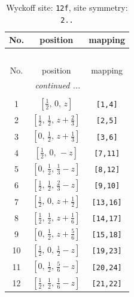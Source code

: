 \documentclass[fleqn,8pt]{jsarticle}
\begin{document}
\begin{longtable}{ccc}
\caption{Wyckoff site: {\tt 12f}, site symmetry: {\tt 2..}}
 \\
 \hline \hline
No. & position & mapping \\ \hline \endfirsthead

\multicolumn{2}{l}{\tablename\ \thetable{}} \\
 \hline \hline
No. & position & mapping \\ \hline \endhead

 \hline \hline
\multicolumn{2}{r}{\footnotesize\it continued ...} \\ \endfoot

 \hline \hline
\multicolumn{2}{r}{} \\ \endlastfoot

1 & $\left[ \frac{1}{2},\, 0,\, z \right]$ & {\tt [1,4]} \\ \hline
2 & $\left[ \frac{1}{2},\, \frac{1}{2},\, z + \frac{2}{3} \right]$ & {\tt [2,5]} \\ \hline
3 & $\left[ 0,\, \frac{1}{2},\, z + \frac{1}{3} \right]$ & {\tt [3,6]} \\ \hline
4 & $\left[ \frac{1}{2},\, 0,\, - z \right]$ & {\tt [7,11]} \\ \hline
5 & $\left[ 0,\, \frac{1}{2},\, \frac{1}{3} - z \right]$ & {\tt [8,12]} \\ \hline
6 & $\left[ \frac{1}{2},\, \frac{1}{2},\, \frac{2}{3} - z \right]$ & {\tt [9,10]} \\ \hline
7 & $\left[ \frac{1}{2},\, 0,\, z + \frac{1}{2} \right]$ & {\tt [13,16]} \\ \hline
8 & $\left[ \frac{1}{2},\, \frac{1}{2},\, z + \frac{1}{6} \right]$ & {\tt [14,17]} \\ \hline
9 & $\left[ 0,\, \frac{1}{2},\, z + \frac{5}{6} \right]$ & {\tt [15,18]} \\ \hline
10 & $\left[ \frac{1}{2},\, 0,\, \frac{1}{2} - z \right]$ & {\tt [19,23]} \\ \hline
11 & $\left[ 0,\, \frac{1}{2},\, \frac{5}{6} - z \right]$ & {\tt [20,24]} \\ \hline
12 & $\left[ \frac{1}{2},\, \frac{1}{2},\, \frac{1}{6} - z \right]$ & {\tt [21,22]} \\
\end{longtable}
\renewcommand{\arraystretch}{1.2}
\end{document}
